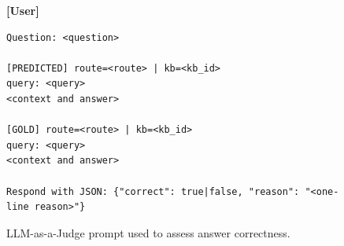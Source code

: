 \documentclass{llmxive}
\begin{document}
{\begin{figure}
\begin{promptbox}
\tcbline

\textbf{[User]}\\[2pt]
\begin{verbatim}
Question: <question>

[PREDICTED] route=<route> | kb=<kb_id>
query: <query>
<context and answer>

[GOLD] route=<route> | kb=<kb_id>
query: <query>
<context and answer>

Respond with JSON: {"correct": true|false, "reason": "<one-line reason>"}
\end{verbatim}
\end{promptbox}
\caption{LLM-as-a-Judge prompt used to assess answer correctness.}
\label{fig:judge_prompt}
\end{figure}

}
\end{document}
